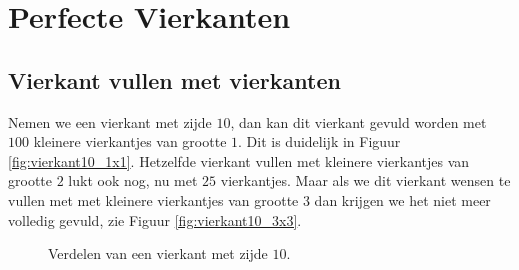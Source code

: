 
\section{Perfecte Vierkanten}

\subsection{Vierkant vullen met vierkanten}

Nemen we een vierkant met zijde $10$, dan kan dit vierkant gevuld worden met $100$ kleinere vierkantjes van grootte $1$. Dit is duidelijk in Figuur \ref{fig:vierkant10_1x1}. Hetzelfde vierkant vullen met kleinere vierkantjes van grootte $2$ lukt ook nog, nu met $25$ vierkantjes. Maar als we dit vierkant wensen te vullen met met kleinere vierkantjes van grootte $3$ dan krijgen we het niet meer volledig gevuld, zie Figuur \ref{fig:vierkant10_3x3}.

\begin{figure}[ht]
  \centering
  \caption{Verdelen van een vierkant met zijde $10$.}
\end{figure}
